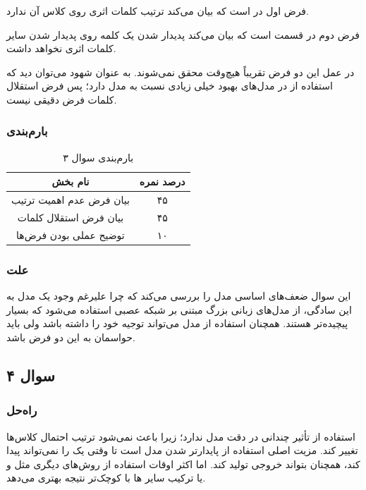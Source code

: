 \documentclass[12pt]{article}
\begin{document}
	فرض اول در 
	است که بیان می‌کند ترتیب کلمات اثری روی کلاس آن ندارد. 
	
	فرض دوم در قسمت 
	است که بیان می‌کند پدیدار شدن یک کلمه روی پدیدار شدن سایر کلمات اثری نخواهد داشت. 
	
	در عمل این دو فرض تقریباً هیچ‌وقت محقق نمی‌شوند. به عنوان شهود می‌توان دید که استفاده از 
	در مدل‌های  بهبود خیلی زیادی نسبت به مدل 
	دارد؛ پس فرض استقلال کلمات فرض دقیقی نیست.
	
	\subsubsection*{بارم‌بندی}
	\begin{table}[H] 
		\centering
		\caption{بارم‌بندی سوال ۳}
		\begin{tabular}{|c|c|}
			\hline
			\textbf{نام بخش} & \textbf{درصد نمره} \\
			\hline
			بیان فرض عدم اهمیت ترتیب & ۴۵ \\
			بیان فرض استقلال کلمات & ۴۵ \\
			توضیح عملی بودن فرض‌ها & ۱۰ \\
			\hline
		\end{tabular}
	\end{table}
	\subsubsection*{علت}
	این سوال ضعف‌های اساسی مدل را بررسی می‌کند که چرا علیرغم وجود یک مدل به این سادگی، از مدل‌های زبانی بزرگ مبتنی بر شبکه عصبی استفاده می‌شود که بسیار پیچیده‌تر هستند. همچنان استفاده از مدل
	می‌تواند توجیه خود را داشته باشد ولی باید حواسمان به این دو فرض باشد. 
	\subsection*{سوال ۴}
	\subsubsection*{راه‌حل}
	استفاده از 
	تأثیر چندانی در دقت مدل ندارد؛ زیرا باعث نمی‌شود ترتیب احتمال کلاس‌ها تغییر کند. مزیت اصلی استفاده از 
	پایدارتر شدن مدل است تا وقتی یک 
	را نمی‌تواند پیدا کند، همچنان بتواند خروجی تولید کند. اما اکثر اوقات استفاده از روش‌های دیگری مثل 
	و یا ترکیب سایر 
	ها با 
	کوچک‌تر نتیجه بهتری می‌دهد.
	
\end{document}
